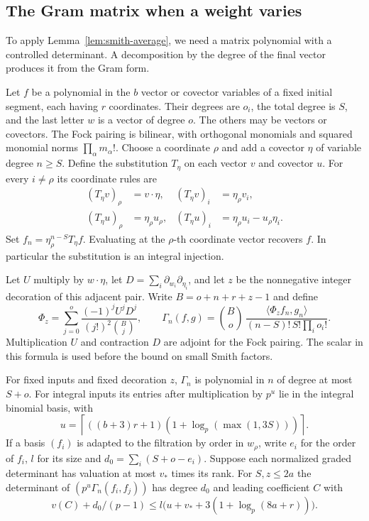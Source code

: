 \subsection{The Gram matrix when a weight varies}
\hypertarget{source-tied-gram}{}

To apply Lemma~\ref{lem:smith-average}, we need a matrix polynomial with a controlled determinant. A decomposition by the degree of the final vector produces it from the Gram form.

Let \(f\) be a polynomial in the \(b\) vector or covector variables of a fixed initial segment, each having \(r\) coordinates. Their degrees are \(o_i\), the
total degree is \(S\), and the last letter \(w\) is a vector of
degree \(o\). The others may be vectors or covectors. The Fock
pairing is bilinear, with orthogonal monomials and squared
monomial norms \(\prod_\alpha m_\alpha!\). Choose a coordinate
\(\rho\) and add a covector \(\eta\) of variable degree \(n\ge S\).
Define the substitution \(T_\eta\) on each vector \(v\) and covector \(u\). For every \(i\ne\rho\) its coordinate rules are
\[
 \begin{aligned} (T_\eta v)_\rho&=v\cdot\eta, & (T_\eta v)_i&=\eta_\rho v_i,\\ (T_\eta u)_\rho&=\eta_\rho u_\rho, & (T_\eta u)_i&=\eta_\rho u_i-u_\rho\eta_i. \end{aligned}
\]
Set \(f_n=\eta_\rho^{n-S}T_\eta f\). Evaluating at the \(\rho\)-th coordinate vector recovers
\(f\). In particular the substitution is an integral injection.

Let \(U\) multiply by \(w\cdot\eta\), let
\(D=\sum_i\partial_{w_i}\partial_{\eta_i}\), and let \(z\)
be the nonnegative integer decoration of this adjacent pair.
Write \(B=o+n+r+z-1\) and define
\[
 \Phi_z=\sum_{j=0}^o\frac{(-1)^j U^jD^j}
                           {(j!)^2\binom Bj},\qquad
 \Gamma_n(f,g)=\binom Bo\,
       \frac{\langle\Phi_z f_n,g_n\rangle}
            {(n-S)!\,S!\prod_i o_i!}.
\]
Multiplication \(U\) and contraction \(D\) are adjoint for the Fock pairing. The scalar
in this formula is used before the bound on small Smith factors.

\begin{lemma}
\label{lem:tied-gram-polynomial}
For fixed inputs and fixed decoration \(z\), \(\Gamma_n\) is polynomial
in \(n\) of degree at most \(S+o\). For integral inputs its entries
after multiplication by \(p^u\) lie in the integral binomial basis, with
\[
 u=\left\lceil ((b+3)r+1)
                    (1+\log_p(\max(1,3S)))\right\rceil .
\]
If a basis \((f_i)\) is adapted to the filtration by order in \(w_\rho\),
write \(e_i\) for the order of \(f_i\), \(l\) for its size and
\(d_0=\sum_i(S+o-e_i)\). Suppose each normalized graded determinant
has valuation at most \(v_*\) times its rank. For \(S,z\le2a\) the
determinant of \((p^u\Gamma_n(f_i,f_j))\) has degree \(d_0\) and leading
coefficient \(C\) with
\[
 v(C)+d_0/(p-1)\le
     l\big(u+v_*+3(1+\log_p(8a+r))\big).
\]
\end{lemma}

